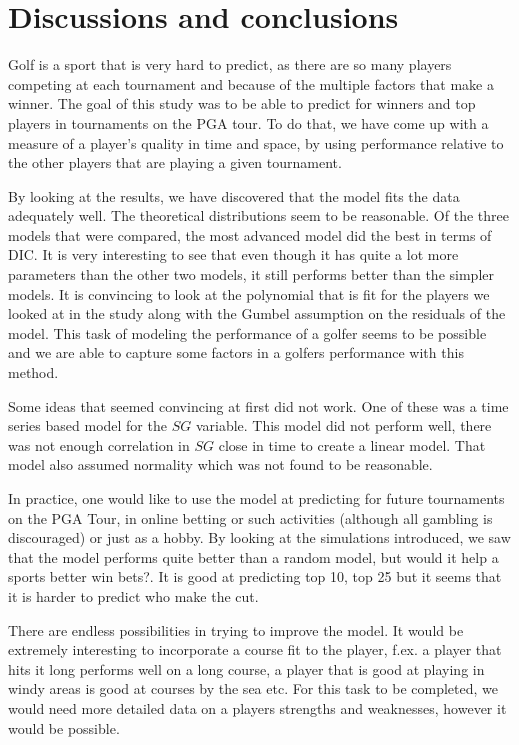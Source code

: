 \documentclass{article}\usepackage[]{graphicx}\usepackage[]{color}
\begin{document}
\newpage
\section{Discussions and conclusions}
Golf is a sport that is very hard to predict, as there are so many players competing at each tournament and because of the multiple factors that make a winner. The goal of this study was to be able to predict for winners and top players in tournaments on the PGA tour. To do that, we have come up with a measure of a player's quality in time and space, by using performance relative to the other players that are playing a given tournament. 
\medskip\par
By looking at the results, we have discovered that the model fits the data adequately well. The theoretical distributions seem to be reasonable. Of the three models that were compared, the most advanced model did the best in terms of DIC. It is very interesting to see that even though it has quite a lot more parameters than the other two models, it still performs better than the simpler models. It is convincing to look at the polynomial that is fit for the players we looked at in the study along with the Gumbel assumption on the residuals of the model. This task of modeling the performance of a golfer seems to be possible and we are able to capture some factors in a golfers performance with this method.
\medskip\par
Some ideas that seemed convincing at first did not work. One of these was a time series based model for the $SG$ variable. This model did not perform well, there was not enough correlation in $SG$ close in time to create a linear model. That model also assumed normality which was not found to be reasonable.
\medskip\par 
In practice, one would like to use the model at predicting for future tournaments on the PGA Tour, in online betting or such activities (although all gambling is discouraged) or just as a hobby. By looking at the simulations introduced, we saw that the model performs quite better than a random model, but would it help a sports better win bets?. It is good at predicting top 10, top 25 but it seems that it is harder to predict who make the cut.
\medskip\par
There are endless possibilities in trying to improve the model. It would be extremely interesting to incorporate a course fit to the player, f.ex. a player that hits it long performs well on a long course, a player that is good at playing in windy areas is good at courses by the sea etc. For this task to be completed, we would need more detailed data on a players strengths and weaknesses, however it would be possible.
\end{document}
